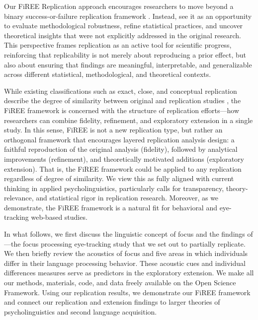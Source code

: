 Our FiREE Replication approach encourages researchers to move beyond a binary success-or-failure replication framework \parencite{Nosek_Errington2020}. Instead, see it as an opportunity to evaluate methodological robustness, refine statistical practices, and uncover theoretical insights that were not explicitly addressed in the original research. This perspective frames replication as an active tool for scientific progress, reinforcing that replicability is not merely about reproducing a prior effect, but also about ensuring that findings are meaningful, interpretable, and generalizable across different statistical, methodological, and theoretical contexts.

While existing classifications such as exact, close, and conceptual replication describe the degree of similarity between original and replication studies \parencite{marsden2018, porte2018, mcmanus2024}, the FiREE framework is concerned with the structure of replication efforts—how researchers can combine fidelity, refinement, and exploratory extension in a single study. In this sense, FiREE is not a new replication type, but rather an orthogonal framework that encourages layered replication analysis design: a faithful reproduction of the original analysis (fidelity), followed by analytical improvements (refinement), and theoretically motivated additions (exploratory extension). That is, the FiREE framework could be applied to any replication regardless of degree of similarity. We view this as fully aligned with current thinking in applied psycholinguistics, particularly calls for transparency, theory-relevance, and statistical rigor in replication research. Moreover, as we demonstrate, the FiREE framework is a natural fit for behavioral and eye-tracking web-based studies.

In what follows, we first discuss the linguistic concept of focus and the findings of \textcite{ge2021a}---the focus processing eye-tracking study that we set out to partially replicate. We then briefly review the acoustics of focus and five areas in which individuals differ in their language processing behavior. These acoustic cues and individual differences measures serve as predictors in the exploratory extension. We make all our methods, materials, code, and data freely available on the Open Science Framework. Using our \textcite{ge2021a} replication results, we demonstrate our FiREE framework and connect our replication and extension findings to larger theories of psycholinguistics and second language acquisition. 

